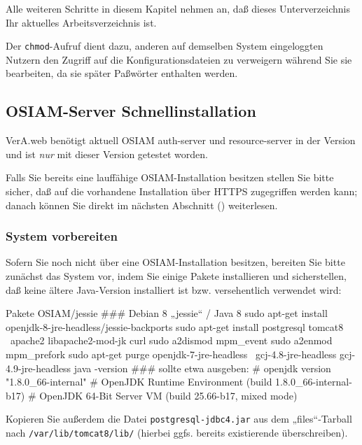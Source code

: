 Alle weiteren Schritte in diesem Kapitel nehmen an, daß dieses
Unterverzeichnis Ihr aktuelles Arbeitsverzeichnis ist.

Der \texttt{chmod}-Aufruf dient dazu, anderen auf demselben System
eingeloggten Nutzern den Zugriff auf die Konfigurationsdateien zu
verweigern während Sie sie bearbeiten, da sie später Paßwörter
enthalten werden.

\subsection{OSIAM-Server Schnellinstallation}\label{subsec:setup-osiam-fast}

VerA.web benötigt aktuell OSIAM auth-server und resource-server in
der Version \vwiaversosiam{} und ist \emph{nur} mit dieser Version
getestet worden.

Falls Sie bereits eine lauffähige OSIAM-Installation besitzen stellen
Sie bitte sicher, daß auf die vorhandene Installation über HTTPS
zugegriffen werden kann; danach können Sie direkt im nächsten Abschnitt
() weiterlesen.

\subsubsection{System vorbereiten}\label{subsubsec:setup-osiam-prepare}

\begin{minipage}{\linewidth}
Sofern Sie noch nicht über eine OSIAM-Installation besitzen, bereiten
Sie bitte zunächst das System vor, indem Sie einige Pakete installieren
und sicherstellen, daß keine ältere Java-Version installiert ist bzw.
versehentlich verwendet wird:

\begin{lstdump}{Pakete OSIAM/jessie}
### Debian 8 „jessie“ / Java 8
sudo apt-get install openjdk-8-jre-headless/jessie-backports
sudo apt-get install postgresql tomcat8 \
    apache2 libapache2-mod-jk curl
sudo a2dismod mpm_event
sudo a2enmod mpm_prefork
sudo apt-get purge openjdk-7-jre-headless \
    gcj-4.8-jre-headless gcj-4.9-jre-headless
java -version
### sollte etwa ausgeben:
# openjdk version "1.8.0_66-internal"
# OpenJDK Runtime Environment (build 1.8.0_66-internal-b17)
# OpenJDK 64-Bit Server VM (build 25.66-b17, mixed mode)
\end{lstdump}
\end{minipage}

Kopieren Sie außerdem die Datei \texttt{postgresql-jdbc4.jar} aus
dem „files“-Tarball nach \texttt{/var/lib/tomcat8/lib/} (hierbei
ggfs. bereits existierende überschreiben).


